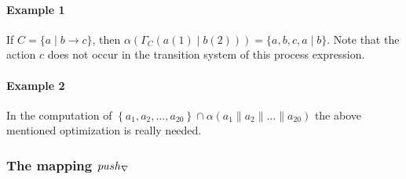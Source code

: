 \documentclass{article}
\begin{document}
\paragraph{Example 1}

If $C=\{a\mid b\rightarrow c\}$, then $\alpha (\Gamma _{C}(a(1)\mid
b(2)))=\{a,b,c,a\mid b\}$. Note that the action $c$ does not occur in the
transition system of this process expression.

\paragraph{Example 2}

In the computation of $\left\{ a_{1},a_{2},\ldots ,a_{20}\right\} \cap
\alpha \left( a_{1}\parallel a_{2}\parallel \ldots \parallel a_{20}\right) $
the above mentioned optimization is really needed.

\subsubsection{The mapping $push_{\protect\nabla }$}
\end{document}
